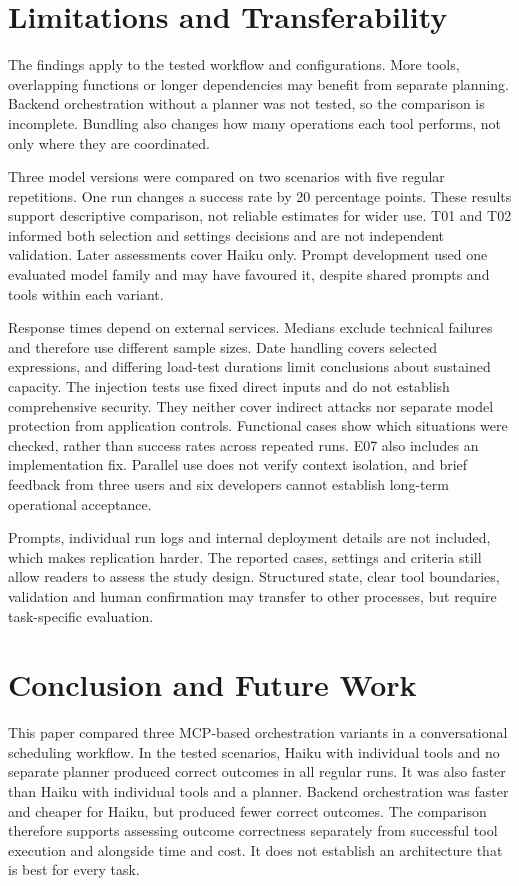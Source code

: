 \section{Limitations and Transferability}\label{sec:limitations}
The findings apply to the tested workflow and configurations.
More tools, overlapping functions or longer dependencies may benefit from separate planning.
Backend orchestration without a planner was not tested, so the comparison is incomplete.
Bundling also changes how many operations each tool performs, not only where they are coordinated.

Three model versions were compared on two scenarios with five regular repetitions.
One run changes a success rate by 20 percentage points.
These results support descriptive comparison, not reliable estimates for wider use.
T01 and T02 informed both selection and settings decisions and are not independent validation.
Later assessments cover Haiku only.
Prompt development used one evaluated model family and may have favoured it, despite shared prompts and tools within each variant.

Response times depend on external services.
Medians exclude technical failures and therefore use different sample sizes.
Date handling covers selected expressions, and differing load-test durations limit conclusions about sustained capacity.
The injection tests use fixed direct inputs and do not establish comprehensive security.
They neither cover indirect attacks nor separate model protection from application controls.
Functional cases show which situations were checked, rather than success rates across repeated runs.
E07 also includes an implementation fix.
Parallel use does not verify context isolation, and brief feedback from three users and six developers cannot establish long-term operational acceptance.

Prompts, individual run logs and internal deployment details are not included, which makes replication harder.
The reported cases, settings and criteria still allow readers to assess the study design.
Structured state, clear tool boundaries, validation and human confirmation may transfer to other processes, but require task-specific evaluation.

\section{Conclusion and Future Work}\label{Sec:ConclusionAndFutureWork}
This paper compared three MCP-based orchestration variants in a conversational scheduling workflow.
In the tested scenarios, Haiku with individual tools and no separate planner produced correct outcomes in all regular runs.
It was also faster than Haiku with individual tools and a planner.
Backend orchestration was faster and cheaper for Haiku, but produced fewer correct outcomes.
The comparison therefore supports assessing outcome correctness separately from successful tool execution and alongside time and cost.
It does not establish an architecture that is best for every task.

